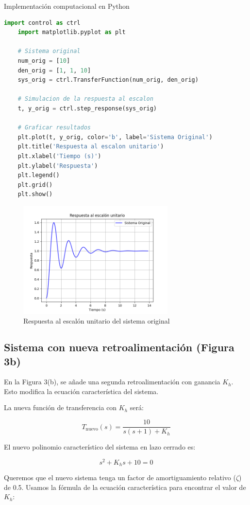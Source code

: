 \documentclass[10pt]{article}
\theoremstyle{definition}
\theoremstyle{remark}
\theoremstyle{definition}
\numberwithin{equation}{prob}
\begin{document}
Implementación computacional en Python
\begin{lstlisting}[language=Python]
	import control as ctrl
	import matplotlib.pyplot as plt
	
	# Sistema original
	num_orig = [10]
	den_orig = [1, 1, 10]
	sys_orig = ctrl.TransferFunction(num_orig, den_orig)

	# Simulacion de la respuesta al escalon
	t, y_orig = ctrl.step_response(sys_orig)

	# Graficar resultados
	plt.plot(t, y_orig, color='b', label='Sistema Original')
	plt.title('Respuesta al escalon unitario')
	plt.xlabel('Tiempo (s)')
	plt.ylabel('Respuesta')
	plt.legend()
	plt.grid()
	plt.show()
\end{lstlisting}

\begin{figure}[h]
    \centering
    \includegraphics[width=0.7\textwidth]{./figures/Figura 4 ejercicio 5.png}
    \caption{Respuesta al escalón unitario del sistema original}
\end{figure}

\subsection{Sistema con nueva retroalimentación (Figura 3b)}

En la Figura 3(b), se añade una segunda retroalimentación con ganancia \(K_h\). Esto modifica la ecuación característica del sistema. 

La nueva función de transferencia con \(K_h\) será:

\[
T_{\text{nuevo}}(s) = \frac{10}{s(s+1) + K_h}
\]

El nuevo polinomio característico del sistema en lazo cerrado es:

\[
s^2 + K_hs + 10 = 0
\]

Queremos que el nuevo sistema tenga un factor de amortiguamiento relativo (\(\zeta\)) de 0.5. Usamos la fórmula de la ecuación característica para encontrar el valor de \(K_h\):
\end{document}
